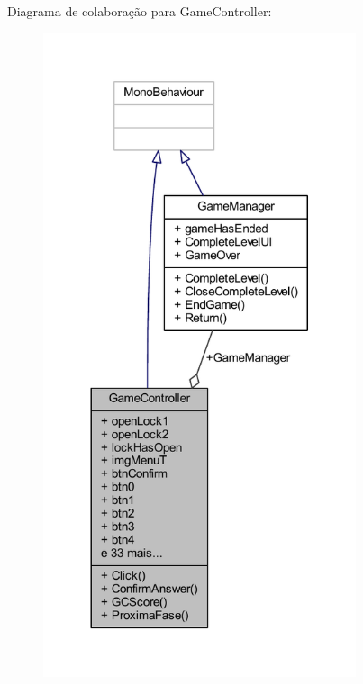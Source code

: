 Diagrama de colaboração para Game\+Controller\+:
\nopagebreak
\begin{figure}[H]
\begin{center}
\leavevmode
\includegraphics[width=260pt]{class_game_controller__coll__graph}
\end{center}
\end{figure}
